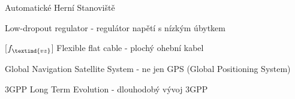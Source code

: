 \cleardoublepage
\chapter*{\listofabbrevname}
{}

\begin{acronym}[KolikMista]

		{Automatické Herní Stanoviště}

		{Low-dropout regulator - regulátor napětí s nízkým úbytkem}

		[\ensuremath{f_\textind{vz}}] %
		{Flexible flat cable - plochý ohební kabel}					%

		{Global Navigation Satellite System - ne jen GPS (Global Positioning System)}
	
		{3GPP Long Term Evolution - dlouhodobý vývoj 3GPP}


\end{acronym}
